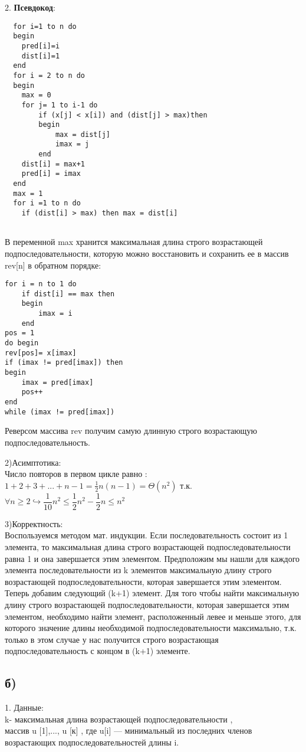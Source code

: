 \documentclass[a4paper,12pt]{article} %
\begin{document}
  2.\hspace{100pt} \textbf{Псевдокод}:
  
  \begin{lstlisting}
  for i=1 to n do 
  begin
  	pred[i]=i
  	dist[i]=1
  end
  for i = 2 to n do 
  begin
  	max = 0
  	for j= 1 to i-1 do
  		if (x[j] < x[i]) and (dist[j] > max)then 
  		begin
  			max = dist[j]
  			imax = j
  		end
  	dist[i] = max+1
  	pred[i] = imax
  end
  max = 1
  for i =1 to n do
  	if (dist[i] > max) then max = dist[i]
  
\end{lstlisting}
  В переменной max хранится максимальная длина строго возрастающей подпоследовательности, которую можно восстановить и сохранить ее в массив rev[n] в обратном порядке:  
  
\begin{lstlisting}
for i = n to 1 do
	if dist[i] == max then 
	begin
		imax = i
	end
pos = 1
do begin
rev[pos]= x[imax]
if (imax != pred[imax]) then
begin
	imax = pred[imax]
	pos++
end
while (imax != pred[imax])
\end{lstlisting}  
Реверсом массива rev получим самую длинную строго возрастающую подпоследовательность.

2)Асимптотика:\\
Число повторов в первом цикле равно :
$1+2+3+...+n-1=\frac{1}{2}n(n-1)=\Theta(n^2)$ т.к.
$ \forall n\geqslant 2 \hookrightarrow \dfrac{1}{10}n^{2}\leqslant\dfrac{1}{2}n^{2}-\dfrac{1}{2}n \leqslant n^{2}$
  	 
  3)Корректность:\\
  Воспользуемся методом мат. индукции.
  Если последовательность состоит из 1 элемента, то максимальная длина строго возрастающей подпоследовательности равна 1 и она завершается этим элементом. Предположим мы нашли для  каждого элемента последовательности из k элементов максимальную длину строго возрастающей подпоследовательности, которая завершается этим элементом. Теперь добавим следующий (k+1) элемент. Для того чтобы найти  максимальную длину строго возрастающей подпоследовательности, которая завершается этим элементом, необходимо найти элемент, расположенный левее и меньше этого, для которого значение длины необходимой подпоследовательности максимально, т.к. только в этом случае у нас получится строго возрастающая подпоследовательность с концом в (k+1) элементе.
\subsection*{б)} 
1. Данные:\\
 k- максимальная длина возрастающей подпоследовательности ,\\
массив u [1],..., u [к] , где u[i] — минимальный из последних членов возрастающих подпоследовательностей длины i.
\end{document}
